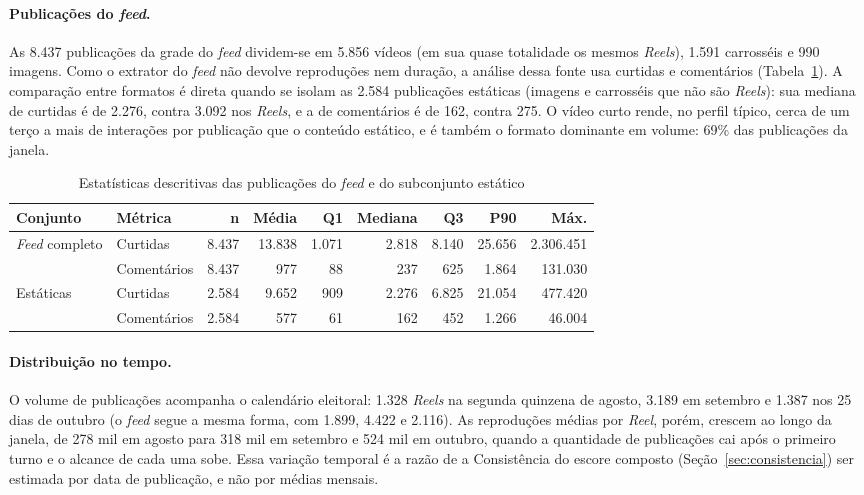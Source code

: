 \paragraph*{Publicações do \emph{feed}.} As 8.437 publicações da grade do \emph{feed} dividem-se em 5.856 vídeos (em sua quase totalidade os mesmos \emph{Reels}), 1.591 carrosséis e 990 imagens. Como o extrator do \emph{feed} não devolve reproduções nem duração, a análise dessa fonte usa curtidas e comentários (Tabela~\ref{tab:estatisticas_feed}). A comparação entre formatos é direta quando se isolam as 2.584 publicações estáticas (imagens e carrosséis que não são \emph{Reels}): sua mediana de curtidas é de 2.276, contra 3.092 nos \emph{Reels}, e a de comentários é de 162, contra 275. O vídeo curto rende, no perfil típico, cerca de um terço a mais de interações por publicação que o conteúdo estático, e é também o formato dominante em volume: 69\% das publicações da janela.

\begin{table}[htb]
\centering
\caption{Estatísticas descritivas das publicações do \emph{feed} e do subconjunto estático}
\label{tab:estatisticas_feed}
\footnotesize\setlength{\tabcolsep}{1.5pt}
\setlength{\tabcolsep}{2.5pt}
\begin{tabular}{llrrrrrrr}
\toprule
\textbf{Conjunto} & \textbf{Métrica} & \textbf{n} & \textbf{Média} & \textbf{Q1} & \textbf{Mediana} & \textbf{Q3} & \textbf{P90} & \textbf{Máx.} \\
\midrule
\emph{Feed} completo & Curtidas & 8.437 & 13.838 & 1.071 & 2.818 & 8.140 & 25.656 & 2.306.451 \\
 & Comentários & 8.437 & 977 & 88 & 237 & 625 & 1.864 & 131.030 \\
Estáticas & Curtidas & 2.584 & 9.652 & 909 & 2.276 & 6.825 & 21.054 & 477.420 \\
 & Comentários & 2.584 & 577 & 61 & 162 & 452 & 1.266 & 46.004 \\
\bottomrule
\end{tabular}
\end{table}

\paragraph*{Distribuição no tempo.} O volume de publicações acompanha o calendário eleitoral: 1.328 \emph{Reels} na segunda quinzena de agosto, 3.189 em setembro e 1.387 nos 25 dias de outubro (o \emph{feed} segue a mesma forma, com 1.899, 4.422 e 2.116). As reproduções médias por \emph{Reel}, porém, crescem ao longo da janela, de 278 mil em agosto para 318 mil em setembro e 524 mil em outubro, quando a quantidade de publicações cai após o primeiro turno e o alcance de cada uma sobe. Essa variação temporal é a razão de a Consistência do escore composto (Seção~\ref{sec:consistencia}) ser estimada por data de publicação, e não por médias mensais.

